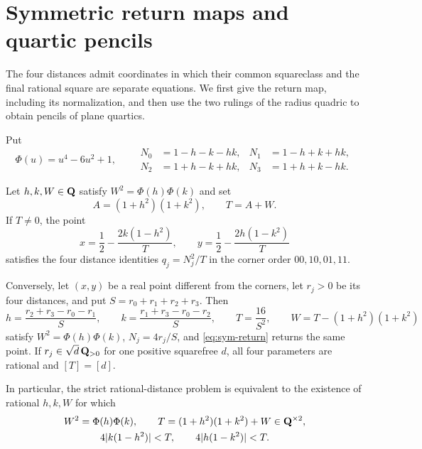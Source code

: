 \section{Symmetric return maps and quartic pencils}
\label{sec:symmetric-models}

The four distances admit coordinates in which their common squareclass
and the final rational square are separate equations.  We first give the
return map, including its normalization, and then use the two rulings of
the radius quadric to obtain pencils of plane quartics.

Put
\[
 \Phi(u)=u^4-6u^2+1,
 \qquad
 \begin{aligned}
 N_0&=1-h-k-hk,&N_1&=1-h+k+hk,\\
 N_2&=1+h-k+hk,&N_3&=1+h+k-hk.
 \end{aligned}
\]

\begin{theorem}
\label{thm:sym-return}
Let $h,k,W\in\mathbf Q$ satisfy $W^2=\Phi(h)\Phi(k)$ and set
\[
 A=(1+h^2)(1+k^2),\qquad T=A+W.
\]
If $T\ne0$, the point
\begin{equation}
 x=\frac12-\frac{2k(1-h^2)}T,
 \qquad
 y=\frac12-\frac{2h(1-k^2)}T
 \label{eq:sym-return}
\end{equation}
satisfies the four distance identities $q_j=N_j^2/T$ in the corner
order $00,10,01,11$.

Conversely, let $(x,y)$ be a real point different from the corners,
let $r_j>0$ be its four distances, and put $S=r_0+r_1+r_2+r_3$.
Then
\begin{equation}
 h=\frac{r_2+r_3-r_0-r_1}{S},\qquad
 k=\frac{r_1+r_3-r_0-r_2}{S},\qquad
 T=\frac{16}{S^2},\qquad W=T-(1+h^2)(1+k^2)
 \label{eq:sym-forward}
\end{equation}
satisfy $W^2=\Phi(h)\Phi(k)$, $N_j=4r_j/S$, and
\eqref{eq:sym-return} returns the same point.  If
$r_j\in\sqrt d\,\mathbf Q_{>0}$ for one positive squarefree $d$, all four
parameters are rational and $[T]=[d]$.

In particular, the strict rational-distance problem is equivalent to
the existence of rational $h,k,W$ for which
\begin{equation}
 \begin{gathered}
 W^2=\Phi(h)\Phi(k),\qquad
 T=(1+h^2)(1+k^2)+W\in\mathbf Q^{\times2},\\
 4|k(1-h^2)|<T,\qquad 4|h(1-k^2)|<T.
 \end{gathered}
 \label{eq:sym-complete-system}
\end{equation}
\end{theorem}

